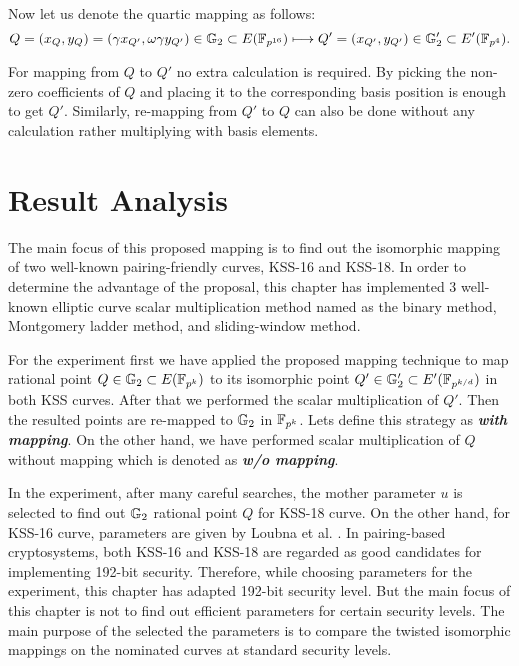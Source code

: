  Now let us denote the quartic mapping as follows:
 \begin{equation}
Q = (x_Q,y_Q) = (\gamma x_{Q'}, \omega \gamma y_{Q'}) \in {\mathbb{G}}_{2} \subset E(\mathbb{F}_{p^{16}})   \longmapsto  Q' = (x_{Q'},y_{Q'}) \in {\mathbb{G}}_{2}'  \subset E'(\mathbb{F}_{p^4}).  \nonumber
 \end{equation}
 
 For mapping from $Q$ to $Q'$ no extra calculation is required. By picking the non-zero coefficients  of $Q$ and placing it to the corresponding basis position is enough to get $Q'$. Similarly, re-mapping from $Q'$ to $Q$  can also be done without any calculation rather multiplying with basis elements.  

\section{Result Analysis}
The main focus of this proposed mapping is to find out the isomorphic mapping of two well-known pairing-friendly curves, KSS-16 and KSS-18. In order to determine the advantage of the proposal, this chapter has implemented 3 well-known elliptic curve scalar multiplication method named as the binary method, Montgomery ladder method, and sliding-window method.

For the experiment first we have applied the proposed mapping technique to map rational point $Q \in {\mathbb{G}}_{2} \subset E({\mathbb{F}}_{p^{k}})$ to its isomorphic point $Q' \in {\mathbb{G}}_{2}' \subset E'(\mathbb{F}_{p^{k/d}})$ in both KSS curves. After that we performed the scalar multiplication of $Q'$. Then the resulted points are re-mapped to ${\mathbb{G}}_{2}$ in $\mathbb{F}_{p^k}$. Lets define this strategy as \textit{\textbf{with mapping}}.
On the other hand, we have performed scalar multiplication of $Q$ without mapping which is denoted as \textit{\textbf{w/o mapping}}.

In the experiment, after many careful searches, the mother parameter $u$ is selected to find out ${\mathbb{G}}_{2}$ rational point $Q$ for KSS-18 curve. On the other hand, for KSS-16 curve, parameters are given by Loubna et al. \cite{EPRINT:GhaFou16b}.
In pairing-based cryptosystems, both KSS-16 and KSS-18 are regarded as good candidates for implementing 192-bit security.
Therefore, while choosing parameters for the experiment, this chapter has adapted 192-bit security level. 
But the main focus of this chapter is not to find out efficient parameters for certain security levels. 
The main purpose of the selected the parameters is to compare the twisted isomorphic mappings on the nominated curves at standard security levels. 

